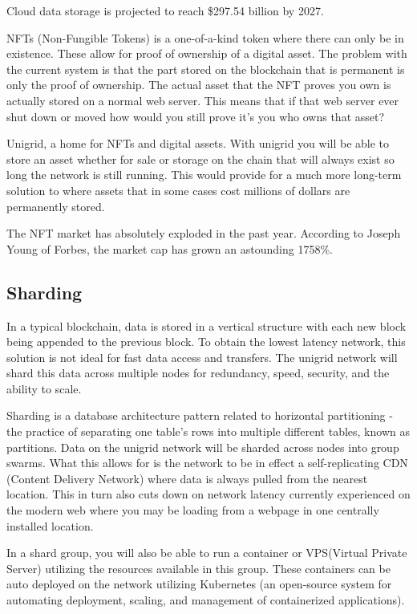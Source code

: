 \documentclass[12pt]{article}
\begin{document}
Cloud data storage is projected to reach \$297.54 billion by 2027\cite{fort2021}.

NFTs (Non-Fungible Tokens) is a one-of-a-kind token where there can only be in existence. These allow for proof of ownership of a digital asset. The problem with the current system is that the part stored on the blockchain that is permanent is only the proof of ownership. The actual asset that the NFT proves you own is actually stored on a normal web server. This means that if that web server ever shut down or moved how would you still prove it's you who owns that asset?

Unigrid, a home for NFTs and digital assets. With unigrid you will be able to store an asset whether for sale or storage on the chain that will always exist so long the network is still running. This would provide for a much more long-term solution to where assets that in some cases cost millions of dollars are permanently stored.

The NFT market has absolutely exploded in the past year. According to Joseph Young of Forbes, the market cap has grown an astounding 1758\%\cite{young2021}.


\subsection*{Sharding}
In a typical blockchain, data is stored in a vertical structure with each new block being appended to the previous block. To obtain the lowest latency network, this solution is not ideal for fast data access and transfers. The unigrid network will shard this data across multiple nodes for redundancy, speed, security, and the ability to scale.

Sharding is a database architecture pattern related to horizontal partitioning - the practice of separating one table’s rows into multiple different tables, known as partitions\cite{mark2019}. Data on the unigrid network will be sharded across nodes into group swarms. What this allows for is the network to be in effect a self-replicating CDN (Content Delivery Network) where data is always pulled from the nearest location. This in turn also cuts down on network latency currently experienced on the modern web where you may be loading from a webpage in one centrally installed location.

In a shard group, you will also be able to run a container or VPS(Virtual Private Server) utilizing the resources available in this group. These containers can be auto deployed on the network utilizing Kubernetes (an open-source system for automating deployment, scaling, and management of containerized applications).
\end{document}
